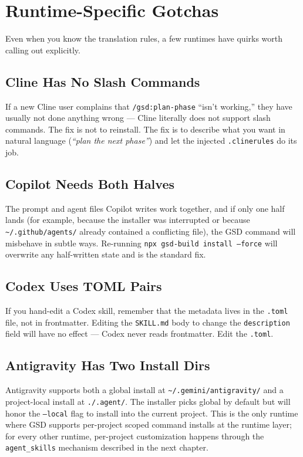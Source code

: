 \documentclass[11pt,letterpaper,openany]{book}
\begin{document}
\section{Runtime-Specific Gotchas}

Even when you know the translation rules, a few runtimes have quirks
worth calling out explicitly.

\subsection{Cline Has No Slash Commands}

If a new Cline user complains that \texttt{/gsd:plan-phase} ``isn't
working,'' they have usually not done anything wrong --- Cline literally
does not support slash commands. The fix is not to reinstall. The fix is
to describe what you want in natural language (\textit{``plan the next
phase''}) and let the injected \texttt{.clinerules} do its job.

\subsection{Copilot Needs Both Halves}

The prompt and agent files Copilot writes work together, and if only one
half lands (for example, because the installer was interrupted or because
\texttt{\~{}/.github/agents/} already contained a conflicting file), the
GSD command will misbehave in subtle ways. Re-running
\texttt{npx gsd-build install --force} will overwrite any half-written
state and is the standard fix.

\subsection{Codex Uses TOML Pairs}

If you hand-edit a Codex skill, remember that the metadata lives in the
\texttt{.toml} file, not in frontmatter. Editing the \texttt{SKILL.md}
body to change the \texttt{description} field will have no effect ---
Codex never reads frontmatter. Edit the \texttt{.toml}.

\subsection{Antigravity Has Two Install Dirs}

Antigravity supports both a global install at
\texttt{\~{}/.gemini/antigravity/} and a project-local install at
\texttt{./.agent/}. The installer picks global by default but will honor
the \texttt{--local} flag to install into the current project. This is
the only runtime where GSD supports per-project scoped command installs
at the runtime layer; for every other runtime, per-project customization
happens through the \texttt{agent\_skills} mechanism described in the
next chapter.
\end{document}
